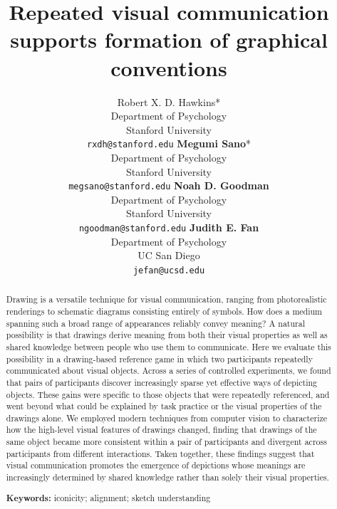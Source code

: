 \documentclass[10pt,letterpaper]{article}
\title{Repeated visual communication supports formation of graphical conventions}
\author{
Robert X. D. Hawkins*  \\ Department of Psychology \\  Stanford University \\  \texttt{rxdh@stanford.edu}
 \And
\textbf{Megumi Sano}* \\ Department of Psychology \\  Stanford University \\ \texttt{megsano@stanford.edu}
 \And
\textbf{Noah D. Goodman} \\ Department of Psychology \\ Stanford University \\  \texttt{ngoodman@stanford.edu}
 \And
\textbf{Judith E. Fan} \\ Department of Psychology \\ UC San Diego \\ \texttt{jefan@ucsd.edu}
}
\begin{document}
\maketitle

\begin{abstract}
Drawing is a versatile technique for visual communication, ranging from photorealistic renderings to schematic diagrams consisting entirely of symbols.
How does a medium spanning such a broad range of appearances reliably convey meaning?
A natural possibility is that drawings derive meaning from both their visual properties as well as shared knowledge between people who use them to communicate.
Here we evaluate this possibility in a drawing-based reference game in which two participants repeatedly communicated about visual objects.
Across a series of controlled experiments, we found that pairs of participants discover increasingly sparse yet effective ways of depicting objects.
These gains were specific to those objects that were repeatedly referenced, and went beyond what could be explained by task practice or the visual properties of the drawings alone.
We employed modern techniques from computer vision to characterize how the high-level visual features of drawings changed, finding that drawings of the same object became more consistent within a pair of participants and divergent across participants from different interactions.
Taken together, these findings suggest that visual communication promotes the emergence of depictions whose meanings are increasingly determined by shared knowledge rather than solely their visual properties.

\textbf{Keywords:}
iconicity; alignment; sketch understanding


\end{abstract}
\end{document}
